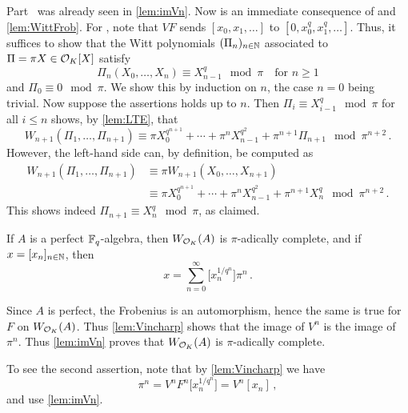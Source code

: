 \documentclass[a4paper, 10pt, oneside, DIV=9, chapterprefix=true, numbers=enddot,bibliography=totoc]{scrbook}
\begin{document}
\begin{proof*}
	Part~ was already seen in \cref{lem:imVn}. Now  is an immediate consequence of  and \cref{lem:WittFrob}. For , note that $VF$ sends $[x_0,x_1,\dotsc]$ to $[0,x_0^q,x_1^q,\dotsc]$. Thus, it suffices to show that the Witt polynomials $(\Pi_n)_{n\in\mathbb{N}}$ associated to $\Pi=\pi X\in\mathcal{O}_K[X]$ satisfy
	\begin{equation*}
		\Pi_n(X_0,\dotsc,X_n)\equiv X_{n-1}^q\mod \pi\quad\text{for }n\geq 1
	\end{equation*}
	and $\Pi_0\equiv 0\mod \pi$. We show this by induction on $n$, the case $n=0$ being trivial. Now suppose the assertions holds up to $n$. Then $\Pi_i\equiv X_{i-1}^q\mod \pi$ for all $i\leq n$ shows, by \cref{lem:LTE}, that
	\begin{equation*}
		W_{n+1}(\Pi_1,\dotsc,\Pi_{n+1})\equiv \pi X_0^{q^{n+1}}+\dotsb+\pi^{n}X_{n-1}^{q^2}+\pi^{n+1}\Pi_{n+1}\mod \pi^{n+2}\,.
	\end{equation*}
	However, the left-hand side can, by definition, be computed as
	\begin{align*}
		W_{n+1}(\Pi_1,\dotsc,\Pi_{n+1})&\equiv\pi W_{n+1}(X_0,\dotsc,X_{n+1})\\
		&\equiv \pi X_0^{q^{n+1}}+\dotsb+\pi^nX_{n-1}^{q^2}+\pi^{n+1}X_n^q\mod \pi^{n+2}\,.
	\end{align*}
	This shows indeed $\Pi_{n+1}\equiv X_n^q\mod \pi$, as claimed.
\end{proof*}
\begin{lem}\label{lem:W_OKpi}
	If $A$ is a perfect $\mathbb{F}_q$-algebra, then $W_{\mathcal{O}_K}(A)$ is $\pi$-adically complete, and if $x=[x_n]_{n\in\mathbb{N}}$, then
	\begin{equation*}
		x=\sum_{n=0}^\infty\big[x_n^{1/q^n}\big]\pi^n\,.
	\end{equation*}
\end{lem}
\begin{proof*}
	Since $A$ is perfect, the Frobenius is an automorphism, hence the same is true for $F$ on $W_{\mathcal{O}_K}(A)$. Thus \cref{lem:Vincharp} shows that the image of $V^n$ is the image of $\pi^n$. Thus \cref{lem:imVn} proves that $W_{\mathcal{O}_K}(A)$ is $\pi$-adically complete.
	
	To see the second assertion, note that by \cref{lem:Vincharp} we have
	\begin{equation*}
		[x_n]\pi^n=V^nF^n\big[x_n^{1/q^n}\big]=V^n[x_n]\,,
	\end{equation*}
	and use \cref{lem:imVn}.
\end{proof*}
\end{document}
